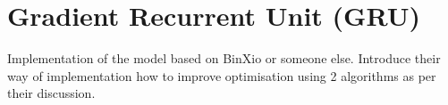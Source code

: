 \section{Gradient Recurrent Unit (GRU)}\label{sec:GRU}
Implementation of the model based on BinXio or someone else. Introduce their way of implementation how to improve optimisation using 2 algorithms as per their discussion.